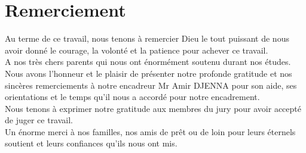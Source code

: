\chapter*{Remerciement}
Au terme de ce travail, nous tenons à remercier Dieu le tout puissant de nous avoir donné le courage, la volonté et la patience pour achever ce travail.\\


A nos très chers parents qui nous ont énormément soutenu durant nos études.\\

Nous avons l’honneur et le plaisir de présenter notre profonde gratitude et nos sincères remerciements à notre encadreur Mr Amir DJENNA pour son aide, ses orientations et le temps qu’il nous a accordé pour notre encadrement.\\

Nous tenons à exprimer notre gratitude aux membres du jury pour avoir accepté de juger ce travail.\\

Un énorme merci à nos familles, nos amis de prêt ou de loin pour leurs éternels soutient et leurs confiances qu’ils nous ont mis.
